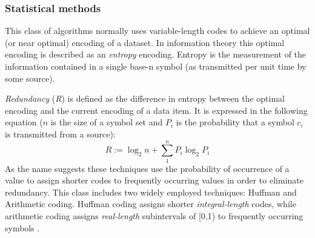 \subsubsection{Statistical methods}
This class of algorithms normally uses variable-length codes to achieve an optimal (or near optimal) encoding of a dataset. In information theory this optimal encoding is 
described as an \textit{entropy} encoding. Entropy is the measurement of the information contained in a single base-n symbol (as transmitted per unit time by some source).

\textit{Redundancy} (\textit{R}) is defined as the difference in entropy between the optimal encoding and the current encoding of a data item. It is expressed in the following equation  
($n$ is the size of a symbol set and $P_{i}$ is the probability that a symbol $c_{i}$ is transmitted from a source)\cite[p. 46 - 47]{salomon2004data}:
\begin{equation}
 R := \log_2n + \sum_1^nP_i\log_2P_i
\end{equation}
As the name suggests these techniques use the probability of occurrence of a value to assign shorter codes to frequently occurring values in order to eliminate redundancy. This 
class includes two widely employed techniques: Huffman and Arithmetic coding. Huffman coding assigns shorter \textit{integral-length} codes, while arithmetic 
coding assigns \textit{real-length} subintervals of [0,1) to frequently occurring symbols \cite{Witten:1987:ACD:214762.214771}\cite[ch. 2]{salomon2004data}.

